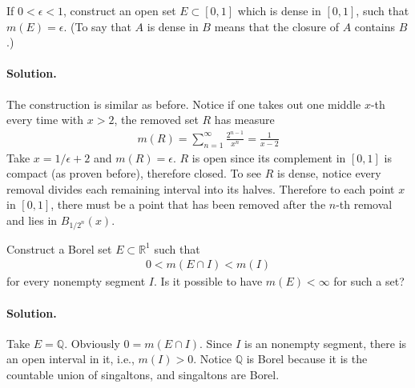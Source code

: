 \documentclass[../main.tex]{subfiles}
\begin{document}
 \begin{exercise}
   If $ 0 < \epsilon < 1 $, construct an open set $ E \subset [0, 1] $ which is dense in $ [0, 1] $, such that $ m(E) = \epsilon $. (To say that $ A $ is dense in $ B $ means that the closure of $ A $ contains $ B $.)

   \paragraph{Solution. }
   The construction is similar as before. Notice if one takes out one middle $ x $-th every time with $ x > 2 $, the removed set $ R $ has measure
   \begin{align*}
     m(R) = \sum_{n=1}^{\infty} \frac {2 ^{n-1} }{x^n}  = \frac {1}{x - 2}
   \end{align*}
   Take $ x = 1/\epsilon + 2 $ and $ m(R) = \epsilon $. $ R $ is open since its complement in $ [0, 1] $ is compact (as proven before), therefore closed. To see $ R $ is dense, notice every removal divides each remaining interval into its halves. Therefore to each point $ x $ in $ [0, 1] $, there must be a point that has been removed after the $ n $-th removal and lies in $ B _{1/2^n} (x) $.

 \end{exercise}

 \begin{exercise}
   Construct a Borel set $ E \subset \mathbb{R}^1 $ such that
   \begin{align*}
     0 < m(E \cap I) < m(I)
   \end{align*}
   for every nonempty segment $ I $. Is it possible to have $ m(E) < \infty $ for such a set?
   \paragraph{Solution. }
   Take $ E = \mathbb{Q} $. Obviously $ 0 = m(E \cap I) $. Since $ I $ is an nonempty segment, there is an open interval in it, i.e., $ m(I) > 0 $. Notice $ \mathbb{Q} $ is Borel because it is the countable union of singaltons, and singaltons are Borel.
 \end{exercise}
\end{document}
